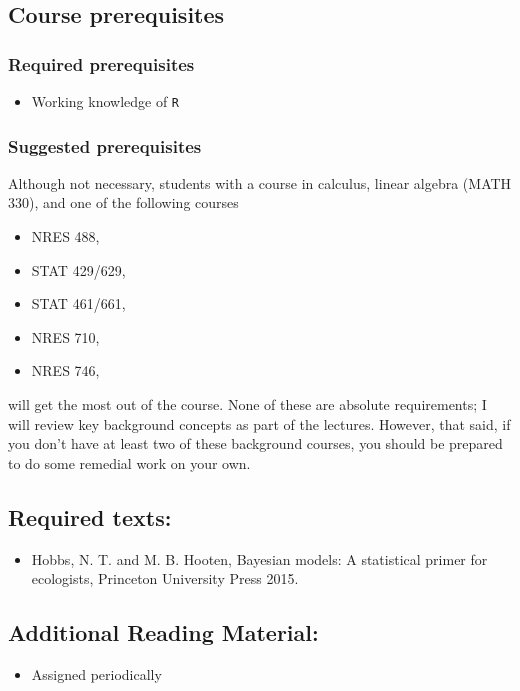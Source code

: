 \documentclass[11pt, a4paper]{article}
\begin{document}
\subsection*{Course prerequisites}
\subsubsection*{Required prerequisites}
\begin{itemize}
\item Working knowledge of \texttt{R}
\end{itemize}

\subsubsection*{Suggested prerequisites}
Although not necessary, students with a course in calculus, linear
algebra (MATH 330), and one of the following
courses
\begin{itemize}
\item NRES 488,
\item STAT 429/629,
\item STAT 461/661,
\item NRES 710,
\item NRES 746,
\end{itemize}
will get the most out of the course. None of these are absolute
requirements; I will review key background concepts as part of the
lectures. However, that said, if you don't have at least two of these
background courses, you should be prepared to do some remedial work on
your own.

\subsection*{Required texts:}
\begin{itemize}
\item Hobbs, N. T. and M. B. Hooten, Bayesian models: A statistical primer
for ecologists, Princeton University Press 2015.
\end{itemize}

\subsection*{Additional Reading Material:}
\begin{itemize}
\item Assigned periodically
\end{itemize}
\end{document}
